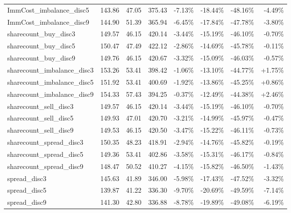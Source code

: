 \begin{table}[ht]
{\begin{tabular}{lRRR|RRRR}
ImmCost\_imbalance\_disc5        &    143.86 &   47.05 &  375.43 &   -7.13\% &  -18.44\% &  -48.16\% &       -4.49\% \\
ImmCost\_imbalance\_disc9        &    144.90 &   51.39 &  365.94 &   -6.45\% &  -17.84\% &  -47.78\% &       -3.80\% \\
sharecount\_buy\_disc3           &    149.57 &   46.15 &  420.14 &   -3.44\% &  -15.19\% &  -46.10\% &       -0.70\% \\
sharecount\_buy\_disc5           &    150.47 &   47.49 &  422.12 &   -2.86\% &  -14.69\% &  -45.78\% &       -0.11\% \\
sharecount\_buy\_disc9           &    149.76 &   46.15 &  420.67 &   -3.32\% &  -15.09\% &  -46.03\% &       -0.57\% \\
sharecount\_imbalance\_disc3     &    153.26 &   53.41 &  398.42 &   -1.06\% &  -13.10\% &  -44.77\% &        +1.75\% \\
sharecount\_imbalance\_disc5     &    151.92 &   53.41 &  400.69 &   -1.92\% &  -13.86\% &  -45.25\% &        +0.86\% \\
sharecount\_imbalance\_disc9     &    154.33 &   57.43 &  394.25 &   -0.37\% &  -12.49\% &  -44.38\% &        +2.46\% \\
sharecount\_sell\_disc3          &    149.57 &   46.15 &  420.14 &   -3.44\% &  -15.19\% &  -46.10\% &       -0.70\% \\
sharecount\_sell\_disc5          &    149.93 &   47.01 &  420.70 &   -3.21\% &  -14.99\% &  -45.97\% &       -0.47\% \\
sharecount\_sell\_disc9          &    149.53 &   46.15 &  420.50 &   -3.47\% &  -15.22\% &  -46.11\% &       -0.73\% \\
sharecount\_spread\_disc3        &    150.35 &   48.23 &  418.91 &   -2.94\% &  -14.76\% &  -45.82\% &       -0.19\% \\
sharecount\_spread\_disc5        &    149.36 &   53.41 &  402.86 &   -3.58\% &  -15.31\% &  -46.17\% &       -0.84\% \\
sharecount\_spread\_disc9        &    148.47 &   50.52 &  410.27 &   -4.15\% &  -15.82\% &  -46.50\% &       -1.43\% \\
spread\_disc3                   &    145.63 &   41.89 &  346.00 &   -5.98\% &  -17.43\% &  -47.52\% &       -3.32\% \\
spread\_disc5                   &    139.87 &   41.22 &  336.30 &   -9.70\% &  -20.69\% &  -49.59\% &       -7.14\% \\
spread\_disc9                   &    141.30 &   42.80 &  336.88 &   -8.78\% &  -19.89\% &  -49.08\% &       -6.19\% \\

\end{tabular}}
\end{table}
